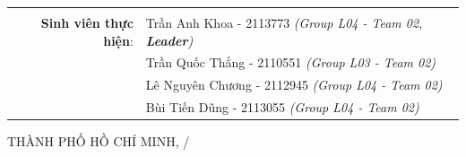 \documentclass[a4paper, 11pt]{article}
\begin{document}
\begin{titlepage}
\begin{table}[h]
\begin{tabular}{rl}
                                          &                                                                       \\[10pt]
            \textbf{Sinh viên thực hiện}: & Trần Anh Khoa - 2113773 \emph{(Group L04 - Team 02, \textbf{Leader})} \\
                                          & Trần Quốc Thắng - 2110551 \emph{(Group L03 - Team 02)}                \\
                                          & Lê Nguyên Chương - 2112945 \emph{(Group L04 - Team 02)}               \\
                                          & Bùi Tiến Dũng - 2113055 \emph{(Group L04 - Team 02)}                  \\
        \end{tabular}
    \end{table}

    \begin{center}
        {\footnotesize THÀNH PHỐ HỒ CHÍ MINH, \the\month/\the\year}
    \end{center}
\end{titlepage}

\pagebreak
\tableofcontents
\pagebreak

\printunsrtglossary[type={symbols}, title={Danh sách ký hiệu}]
\printunsrtglossary[type={abbreviations}, title={Danh sách từ viết tắt}]
\pagebreak
\listoffigures
\listoftables
\pagebreak
{}


\end{document}
